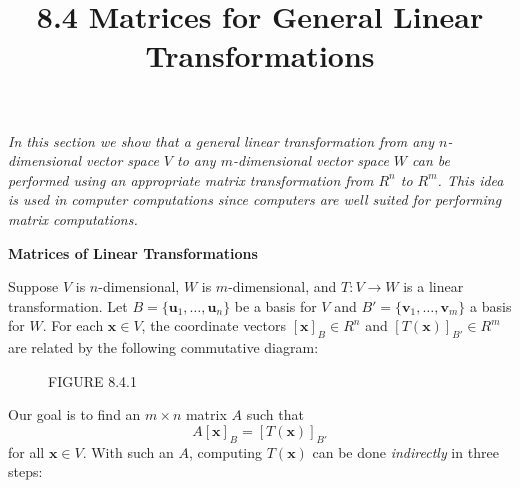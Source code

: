 \documentclass{article}
\title{8.4 Matrices for General Linear Transformations}
\date{}
\author{}
\newcommand{\redheading}[1]{{\vspace{2mm}\noindent\Large\bfseries\color{red!55!black} #1\par}\vspace{2mm}}
\begin{document}
\maketitle

{\itshape\color{blue!45!black}
In this section we show that a general linear transformation from any $n$-dimensional
vector space $V$ to any $m$-dimensional vector space $W$ can be performed using an
appropriate matrix transformation from $R^n$ to $R^m$. This idea is used in computer
computations since computers are well suited for performing matrix computations.\par}

\vspace{2mm}

\redheading{Matrices of Linear Transformations}

Suppose $V$ is $n$-dimensional, $W$ is $m$-dimensional, and $T : V \to W$ is a linear
transformation. Let $B = \{\mathbf{u}_1,\ldots,\mathbf{u}_n\}$ be a basis for $V$ and
$B' = \{\mathbf{v}_1,\ldots,\mathbf{v}_m\}$ a basis for $W$. For each $\mathbf{x} \in V$,
the coordinate vectors $[\mathbf{x}]_B \in R^n$ and $[T(\mathbf{x})]_{B'} \in R^m$ are
related by the following commutative diagram:

\begin{figure}[ht]
\centering
{}
\caption*{FIGURE 8.4.1}
\end{figure}

Our goal is to find an $m \times n$ matrix $A$ such that
\begin{equation}
  A[\mathbf{x}]_B = [T(\mathbf{x})]_{B'} \tag{1}
\end{equation}
for all $\mathbf{x} \in V$. With such an $A$, computing $T(\mathbf{x})$ can be done
\emph{indirectly} in three steps:
\end{document}
